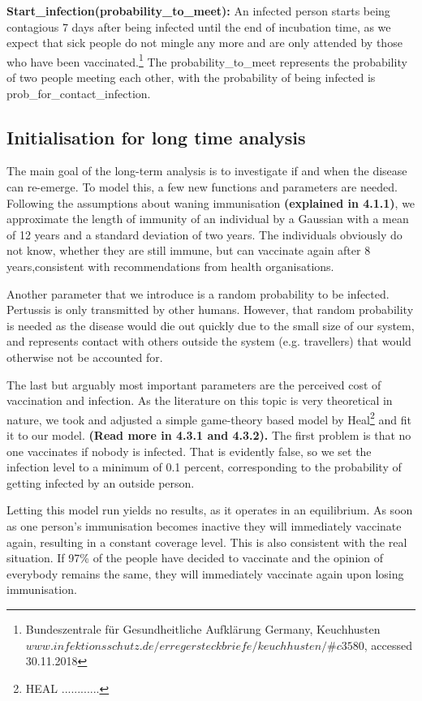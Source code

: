 \documentclass[11pt]{article}
\begin{document}
\textbf{Start\_infection(probability\_to\_meet):} An infected person starts being contagious 7 days after being infected until the end of incubation time, as we expect that sick people do not mingle any more and are only attended by those who have been vaccinated.\footnote{Bundeszentrale für Gesundheitliche Aufklärung Germany, Keuchhusten \break
$www.infektionsschutz.de/erregersteckbriefe/keuchhusten/\#c3580$, accessed 30.11.2018} The probability\_to\_meet represents the probability of two people meeting each other, with the probability of being infected is prob\_for\_contact\_infection.
\vspace{14px}


\subsection{Initialisation for long time analysis}
The main goal of the long-term analysis is to investigate if and when the disease can re-emerge. To model this, a few new functions and parameters are needed. Following the assumptions about waning immunisation \textbf{(explained in 4.1.1)}, we approximate the length of immunity of an individual by a Gaussian with a mean of 12 years and a standard deviation of two years. The individuals obviously do not know, whether they are still immune, but can vaccinate again after 8 years,consistent with recommendations from health organisations. 

Another parameter that we introduce is a random probability to be infected. Pertussis is only transmitted by other humans. However, that random probability is needed as the disease would die out quickly due to the small size of our system, and represents contact with others outside the system (e.g. travellers) that would otherwise not be accounted for. 

The last but arguably most important parameters are the perceived cost of vaccination and infection. As the literature on this topic is very theoretical in nature, we took and adjusted a simple game-theory based model by Heal\footnote{HEAL ............} and fit it to our model. \textbf{(Read more in 4.3.1 and 4.3.2).} The first problem is that no one vaccinates if nobody is infected. That is evidently false, so we set the infection level to a minimum of 0.1 percent, corresponding to the probability of getting infected by an outside person.
\vspace{14px}


Letting this model run yields no results, as it operates in an equilibrium. As soon as one person’s immunisation becomes inactive they will immediately vaccinate again, resulting in a constant coverage level. This is also consistent with the real situation. If 97\% of the people have decided to vaccinate and the opinion of everybody remains the same, they will immediately vaccinate again upon losing immunisation.
\vspace{14px}
\end{document}
